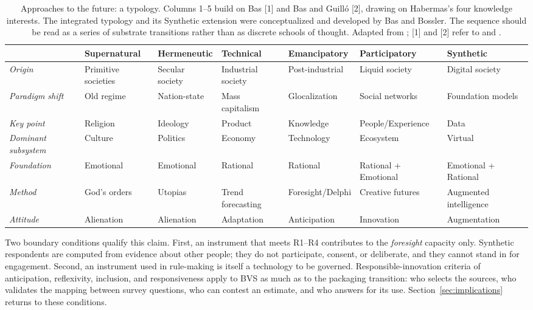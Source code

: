 \begin{table}[htbp]
\centering
\caption{Approaches to the future: a typology. Columns 1--5 build on Bas [1]
and Bas and Guill\'o [2], drawing on Habermas's four knowledge interests. The
integrated typology and its Synthetic extension were conceptualized and
developed by Bas and Bossler. The sequence should be read as a series of
substrate transitions rather than as discrete schools of thought.
Adapted from \citet[Table~1]{bossler2026}; [1] and [2] refer to
\citet{bas2004} and \citet{bas2015}.}
\label{tab:typology}
\scriptsize
\setlength{\tabcolsep}{4pt}
\renewcommand{\arraystretch}{1.15}
\begin{tabularx}{\textwidth}{>{\itshape}l*{6}{>{\raggedright\arraybackslash}X}}
\toprule
\normalfont & \textbf{Supernatural} & \textbf{Hermeneutic} & \textbf{Technical} &
  \textbf{Emancipatory} & \textbf{Participatory} & \textbf{Synthetic} \\
\midrule
Origin & Primitive societies & Secular society & Industrial society &
  Post-industrial & Liquid society & Digital society \\
Paradigm shift & Old regime & Nation-state & Mass capitalism & Glocalization &
  Social networks & Foundation models \\
Key point & Religion & Ideology & Product & Knowledge & People/\allowbreak Experience & Data \\
Dominant subsystem & Culture & Politics & Economy & Technology & Ecosystem &
  Virtual \\
Foundation & Emotional & Emotional & Rational & Rational & Rational + Emotional &
  Emotional + Rational \\
Method & God's orders & Utopias & Trend forecasting & Foresight/\allowbreak Delphi &
  Creative futures & Augmented intelligence \\
Attitude & Alienation & Alienation & Adaptation & Anticipation & Innovation &
  Augmentation \\
\bottomrule
\end{tabularx}
\end{table}

Two boundary conditions qualify this claim. First, an instrument that meets
R1--R4 contributes to the \emph{foresight} capacity only. Synthetic respondents
are computed from evidence about other people; they do not participate,
consent, or deliberate, and they cannot stand in for engagement. Second, an
instrument used in rule-making is itself a technology to be governed.
Responsible-innovation criteria of anticipation, reflexivity, inclusion, and
responsiveness \citep{stilgoe2013} apply to BVS as much as to the packaging
transition: who selects the sources, who validates the mapping between survey
questions, who can contest an estimate, and who answers for its use.
Section~\ref{sec:implications} returns to these conditions.

